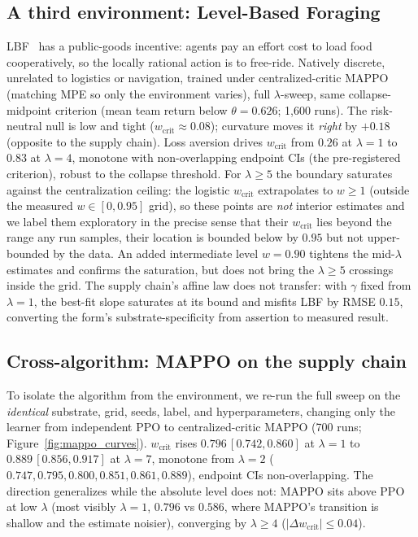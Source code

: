 \documentclass[letterpaper]{article} %
\theoremstyle{plain}
\newcommand{\wcrit}{w_{\mathrm{crit}}}
\begin{document}
\subsection{A third environment: Level-Based Foraging}
LBF~\citep{christianos2020shared} has a public-goods incentive: agents pay an effort cost to
load food cooperatively, so the locally rational action is to free-ride. Natively discrete,
unrelated to logistics or navigation, trained under centralized-critic MAPPO (matching MPE so
only the environment varies), full $\lambda$-sweep, same collapse-midpoint criterion (mean team
return below $\theta{=}0.626$; 1{,}600
runs). The risk-neutral null is low and tight ($\wcrit\approx0.08$); curvature moves it
\emph{right} by $+0.18$ (opposite to the supply chain). Loss aversion drives $\wcrit$ from
$0.26$ at $\lambda{=}1$ to $0.83$ at $\lambda{=}4$, monotone with non-overlapping endpoint CIs
(the pre-registered criterion), robust to the collapse threshold. For $\lambda\geq5$ the
boundary saturates against the centralization ceiling: the logistic $\wcrit$ extrapolates to
$w\geq1$ (outside the measured $w\in[0,0.95]$ grid), so these points are \emph{not} interior
estimates and we label them exploratory in the precise sense that their $\wcrit$ lies beyond the
range any run samples, their location is bounded below by $0.95$ but not upper-bounded by the data.
An added intermediate level $w{=}0.90$ tightens the mid-$\lambda$ estimates and confirms the
saturation, but does not bring the $\lambda\geq5$ crossings inside the grid. The supply chain's affine law does not transfer: with $\gamma$ fixed
from $\lambda{=}1$, the best-fit slope saturates at its bound and misfits LBF by RMSE $0.15$,
converting the form's substrate-specificity from assertion to measured result.

\subsection{Cross-algorithm: MAPPO on the supply chain}
To isolate the algorithm from the environment, we re-run the full sweep on the \emph{identical}
substrate, grid, seeds, label, and hyperparameters, changing only the learner from independent
PPO to centralized-critic MAPPO (700 runs; Figure~\ref{fig:mappo_curves}). $\wcrit$ rises
$0.796\,[0.742,0.860]$ at $\lambda{=}1$ to $0.889\,[0.856,0.917]$ at $\lambda{=}7$, monotone
from $\lambda{=}2$ ($0.747,0.795,0.800,0.851,0.861,0.889$), endpoint CIs non-overlapping. The
direction generalizes while the absolute level does not: MAPPO sits above PPO at low $\lambda$
(most visibly $\lambda{=}1$, $0.796$ vs $0.586$, where MAPPO's transition is shallow and the
estimate noisier), converging by $\lambda\geq4$ ($|\Delta\wcrit|\leq0.04$).
\end{document}
